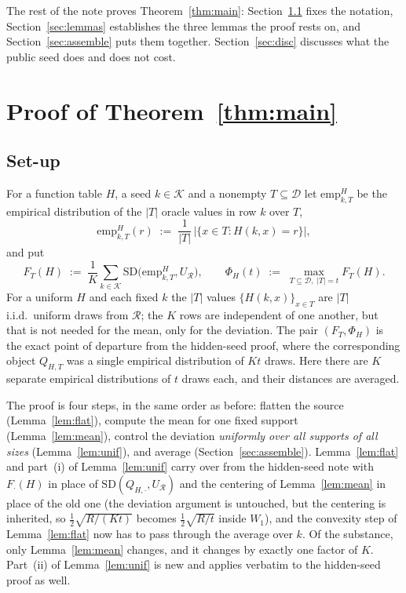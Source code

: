 \documentclass{conjura-solution}
\newcommand{\SD}{\mathrm{SD}}
\newcommand{\calK}{\mathcal{K}}
\newcommand{\calD}{\mathcal{D}}
\newcommand{\calR}{\mathcal{R}}
\newcommand{\emp}{\mathrm{emp}}
\begin{document}
The rest of the note proves Theorem~\ref{thm:main}: Section~\ref{sec:setup} fixes the notation,
Section~\ref{sec:lemmas} establishes the three lemmas the proof rests on, and
Section~\ref{sec:assemble} puts them together. Section~\ref{sec:disc} discusses what the public
seed does and does not cost.

\section{Proof of Theorem~\ref{thm:main}}\label{sec:proof}

\subsection{Set-up}\label{sec:setup}

For a function table $H$, a seed $k \in \calK$ and a nonempty $T \subseteq \calD$ let
$\emp^{H}_{k,T}$ be the empirical distribution of the $|T|$ oracle values in row $k$ over $T$,
\[
  \emp^{H}_{k,T}(r) \;:=\; \frac{1}{|T|}\,\bigl|\{x \in T : H(k,x) = r\}\bigr| ,
\]
and put
\[
  F_{T}(H) \;:=\; \frac{1}{K}\sum_{k \in \calK} \SD\bigl(\emp^{H}_{k,T}, U_{\calR}\bigr),
  \qquad
  \Phi_{H}(t) \;:=\; \max_{T \subseteq \calD,\; |T| = t} F_{T}(H) .
\]
For a uniform $H$ and each fixed $k$ the $|T|$ values $\{H(k,x)\}_{x \in T}$ are $|T|$ i.i.d.\
uniform draws from $\calR$; the $K$ rows are independent of one another, but that is not needed for
the mean, only for the deviation. The pair $(F_{T}, \Phi_{H})$ is the exact point of departure from the hidden-seed proof,
where the corresponding object $Q_{H,T}$ was a single empirical distribution of $Kt$ draws. Here
there are $K$ separate empirical distributions of $t$ draws each, and their distances are averaged.

\smallskip
The proof is four steps, in the same order as before: flatten the source (Lemma~\ref{lem:flat}),
compute the mean for one fixed support (Lemma~\ref{lem:mean}), control the deviation \emph{uniformly
over all supports of all sizes} (Lemma~\ref{lem:unif}), and average (Section~\ref{sec:assemble}).
Lemma~\ref{lem:flat} and part~(i) of Lemma~\ref{lem:unif} carry over from the hidden-seed note with
$F_{\cdot}(H)$ in place of $\SD(Q_{H,\cdot},U_{\calR})$ and the centering of
Lemma~\ref{lem:mean} in place of the old one (the deviation argument is untouched, but the
centering is inherited, so $\tfrac12\sqrt{R/(Kt)}$ becomes $\tfrac12\sqrt{R/t}$ inside $W_{1}$),
and the convexity step of Lemma~\ref{lem:flat} now has to pass through the average over $k$. Of the
substance, only Lemma~\ref{lem:mean} changes, and it changes by exactly one factor of $K$.
Part~(ii) of Lemma~\ref{lem:unif} is new and applies verbatim to the hidden-seed proof as well.
\end{document}
